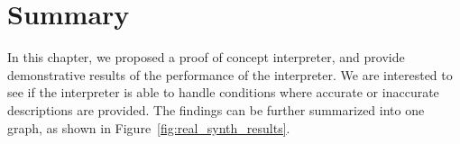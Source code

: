 

\section{Summary}
In this chapter, we proposed a proof of concept interpreter, and provide demonstrative results of the performance of the interpreter. We are interested to see if the interpreter is able to handle conditions where accurate or inaccurate descriptions are provided. The findings can be further summarized into one graph, as shown in Figure~\ref{fig:real_synth_results}.
